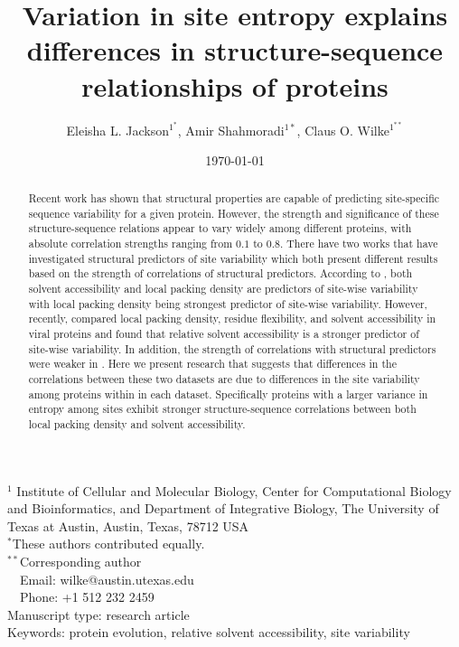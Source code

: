 \documentclass[12pt]{article}
\title{Variation in site entropy explains differences in structure-sequence relationships of proteins}
\author{Eleisha L. Jackson$^{1^*}$, Amir Shahmoradi$^{1*}$, Claus O. Wilke$^{1^{**}}$}
\begin{document}
\date{\today}
\maketitle


\noindent
$^1$ Institute of Cellular and Molecular Biology, Center for Computational Biology and Bioinformatics, and Department of Integrative Biology, The University of Texas at Austin, Austin, Texas, 78712 USA\\

\noindent $^{*}$These authors contributed equally. \\

\bigskip
\noindent
$^{**}$Corresponding author\\
$\phantom{^{** }}$Email: wilke@austin.utexas.edu\\
$\phantom{^{**}}$Phone: +1 512 232 2459\\

\bigskip
\noindent
Manuscript type: research article\\
\bigskip
\noindent  Keywords: protein evolution, relative solvent accessibility, site variability


\begin{abstract}
Recent work has shown that structural properties are capable of predicting site-specific sequence variability for a given protein. However, the strength and significance of these structure-sequence relations appear to vary widely among different proteins, with absolute correlation strengths ranging from $0.1$ to $0.8$. There have two works that have investigated structural predictors of site variability which both present different results based on the strength of correlations of structural predictors. According to \cite{Yehetal2014a}, both solvent accessibility and local packing density are predictors of site-wise variability with local packing density being strongest predictor of site-wise variability. However, recently, \cite{Shahmoradietal2014} compared local packing density, residue flexibility, and solvent accessibility in viral proteins and found that relative solvent accessibility is a stronger predictor of site-wise variability. In addition, the strength of correlations with structural predictors were weaker in \cite{Shahmoradietal2014}.  Here we present research that suggests that differences in the correlations between these two datasets are due to differences in the site variability among proteins within in each dataset. Specifically proteins with a larger variance in entropy among sites exhibit stronger structure-sequence correlations between both local packing density and solvent accessibility. 
\end{abstract}
\vfill
\vfill
\def\thefootnote{\fnsymbol{footnote}}
\setcounter{footnote}{0}
\end{document}
